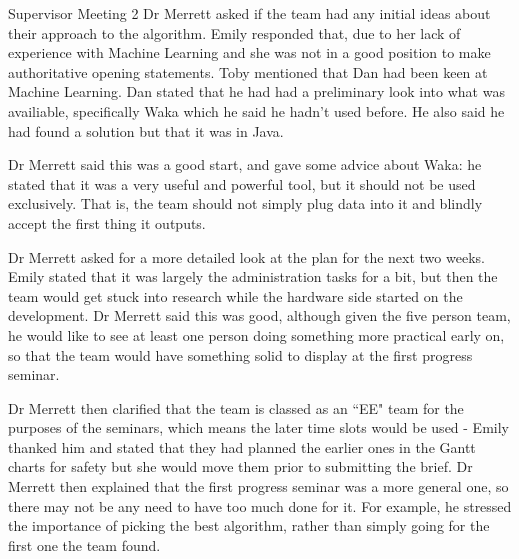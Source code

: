 \documentclass{article}
\begin{document}
\begin{Minutes}{Supervisor Meeting 2}
Dr Merrett asked if the team had any initial ideas about their approach to the algorithm. Emily
responded that, due to her lack of experience with Machine Learning and she was not in a good
position to make authoritative opening statements. Toby mentioned that Dan had been keen at
Machine Learning. Dan stated that he had had a preliminary look into what was availiable,
specifically Waka which he said he hadn't used before. He also said he had found a solution
but that it was in Java.

Dr Merrett said this was a good start, and gave some advice about Waka: he stated that it was
a very useful and powerful tool, but it should not be used exclusively. That is, the team should
not simply plug data into it and blindly accept the first thing it outputs.

Dr Merrett asked for a more detailed look at the plan for the next two weeks. Emily stated that
it was largely the administration tasks for a bit, but then the team would get stuck into
research while the hardware side started on the development. Dr Merrett said this was good,
although given the five person team, he would like to see at least one person doing something
more practical early on, so that the team would have something solid to display at the first
progress seminar.

Dr Merrett then clarified that the team is classed as an ``EE" team for the purposes of the
seminars, which means the later time slots would be used - Emily thanked him and stated that
they had planned the earlier ones in the Gantt charts for safety but she would move them
prior to submitting the brief. Dr Merrett then explained that the first progress seminar was
a more general one, so there may not be any need to have too much done for it. For example,
he stressed the importance of picking the best algorithm, rather than simply going for the
first one the team found.

\end{Minutes}
\end{document}
